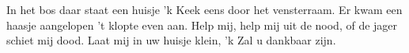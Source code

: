 \beginverse*
In het bos daar staat een huisje
'k Keek eens door het vensterraam.
Er kwam een haasje aangelopen
't klopte even aan.
Help mij, help mij uit de nood,
of de jager schiet mij dood.
Laat mij in uw huisje klein,
'k Zal u dankbaar zijn. 
\endverse
\endsong